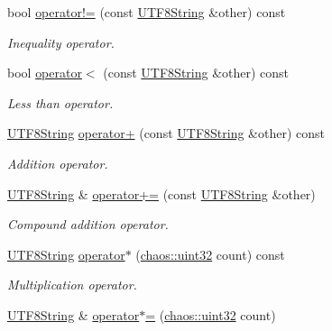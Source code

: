 \begin{DoxyCompactItemize}
bool \hyperlink{classchaos_1_1uni_1_1_u_t_f8_string_ad2a48c9e0d16c41b64efae5b3c02d0a0}{operator!=} (const \hyperlink{classchaos_1_1uni_1_1_u_t_f8_string}{U\+T\+F8\+String} \&other) const 
\begin{DoxyCompactList}\small\item\em Inequality operator. \end{DoxyCompactList}\item 
bool \hyperlink{classchaos_1_1uni_1_1_u_t_f8_string_ad550d07d711ab6567d0ea91a18d403d0}{operator$<$} (const \hyperlink{classchaos_1_1uni_1_1_u_t_f8_string}{U\+T\+F8\+String} \&other) const 
\begin{DoxyCompactList}\small\item\em Less than operator. \end{DoxyCompactList}\item 
\hyperlink{classchaos_1_1uni_1_1_u_t_f8_string}{U\+T\+F8\+String} \hyperlink{classchaos_1_1uni_1_1_u_t_f8_string_a5fe1d0226ef6cb5517a57feb1b7f2170}{operator+} (const \hyperlink{classchaos_1_1uni_1_1_u_t_f8_string}{U\+T\+F8\+String} \&other) const 
\begin{DoxyCompactList}\small\item\em Addition operator. \end{DoxyCompactList}\item 
\hyperlink{classchaos_1_1uni_1_1_u_t_f8_string}{U\+T\+F8\+String} \& \hyperlink{classchaos_1_1uni_1_1_u_t_f8_string_afec3c3e16fabcabbc833e5343fddd4cc}{operator+=} (const \hyperlink{classchaos_1_1uni_1_1_u_t_f8_string}{U\+T\+F8\+String} \&other)
\begin{DoxyCompactList}\small\item\em Compound addition operator. \end{DoxyCompactList}\item 
\hyperlink{classchaos_1_1uni_1_1_u_t_f8_string}{U\+T\+F8\+String} \hyperlink{classchaos_1_1uni_1_1_u_t_f8_string_ae281a6e92025aee3b31442574c3b335e}{operator$\ast$} (\hyperlink{namespacechaos_a8641b3ae4551f0b35570d4f9f4ec22d9}{chaos\+::uint32} count) const 
\begin{DoxyCompactList}\small\item\em Multiplication operator. \end{DoxyCompactList}\item 
\hyperlink{classchaos_1_1uni_1_1_u_t_f8_string}{U\+T\+F8\+String} \& \hyperlink{classchaos_1_1uni_1_1_u_t_f8_string_a32d6e265762d24b6185573d8693a7fc7}{operator$\ast$=} (\hyperlink{namespacechaos_a8641b3ae4551f0b35570d4f9f4ec22d9}{chaos\+::uint32} count)

\end{DoxyCompactItemize}

